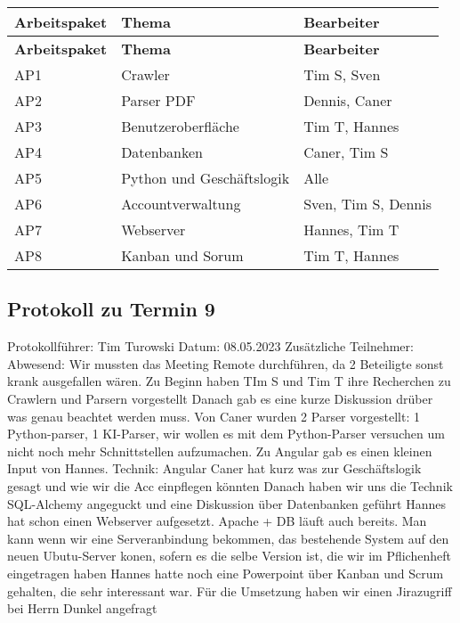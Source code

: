 \begin{flushleft}
	\begin{longtable}{p{4cm}p{7cm}p{3cm}}
		\toprule
		\textbf{Arbeitspaket} & \textbf{Thema} & \textbf{Bearbeiter}\\
		\midrule\endfirsthead
		\toprule
		\textbf{Arbeitspaket} & \textbf{Thema} & \textbf{Bearbeiter}\\
\midrule\endfirsthead
		AP1 & Crawler &  Tim S, Sven\\ \midrule
		AP2& Parser PDF &  Dennis, Caner\\ \midrule
		AP3 & Benutzeroberfläche & Tim T, Hannes\\ \midrule
		AP4 & Datenbanken & Caner, Tim S\\ \midrule
		AP5 & Python und Geschäftslogik &  Alle\\ \midrule
		AP6 & Accountverwaltung &  Sven, Tim S, Dennis\\ \midrule
		AP7 & Webserver & Hannes, Tim T\\ \midrule
		AP8 & Kanban und Sorum & Tim T, Hannes\\
		\bottomrule
	\end{longtable}
\end{flushleft}
\newpage
\subsection{Protokoll zu Termin 9}
Protokollführer: Tim Turowski\newline
Datum: 08.05.2023 \newline
Zusätzliche Teilnehmer:  \newline
Abwesend: \newline \newline
Wir mussten das Meeting Remote durchführen, da 2 Beteiligte sonst krank ausgefallen wären.\newline
Zu Beginn haben TIm S und Tim T ihre Recherchen zu Crawlern und Parsern vorgestellt \newline
Danach gab es eine kurze Diskussion drüber was genau beachtet werden muss.\newline
Von Caner wurden 2 Parser vorgestellt: 1 Python-parser, 1 KI-Parser, wir wollen es mit dem Python-Parser versuchen um nicht noch mehr Schnittstellen aufzumachen.\newline
Zu Angular gab es einen kleinen Input von Hannes. Technik: Angular\newline
Caner hat kurz was zur Geschäftslogik gesagt und wie wir die Acc einpflegen könnten \newline
Danach haben wir uns die Technik SQL-Alchemy angeguckt und eine Diskussion über Datenbanken geführt \newline
Hannes hat schon einen Webserver aufgesetzt. Apache + DB läuft auch bereits. Man kann wenn wir eine Serveranbindung bekommen, das bestehende System auf den neuen Ubutu-Server konen, sofern es die selbe Version ist, die wir im Pflichenheft eingetragen haben\newline
Hannes hatte noch eine Powerpoint über Kanban und Scrum gehalten, die sehr interessant war. Für die Umsetzung haben wir einen Jirazugriff bei Herrn Dunkel angefragt\newline
\newpage
